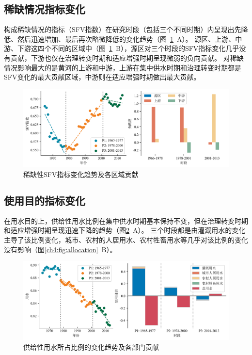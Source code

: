 \subsection{稀缺情况指标变化}

构成稀缺情况的指标（SFV指数）在研究时段（包括三个不同时期）内呈现出先降低、然后迅速增加、最后再次略微降低的变化趋势（图~\ref{ch4:fig:scarcity}~A）。
源区、上游、中游、下游这四个不同的区域中（图~\ref{ch4:fig:scarcity}~B），源区对三个时段的SFV指标变化几乎没有贡献，下游也仅在治理转变时期和适应增强时期呈现微弱的负向贡献。
对稀缺情况影响最大的是黄河的上游和中游，上游在集中供水时期和治理转变时期都是SFV变化的最大贡献区域，中游则在适应增强时期做出最大贡献。

\begin{figure}[htb]
  \centering
  \includegraphics[width=\textwidth]{img/ch4/ch4_scarcity.png}
  \caption{稀缺性SFV指标变化趋势及各区域贡献}\label{ch4:fig:scarcity}
\end{figure}


\subsection{使用目的指标变化}

在用水目的上，供给性用水比例在集中供水时期基本保持不变，但在治理转变时期和适应增强时期呈现迅速下降的趋势（图\ref{ch4:fig:priority}~A）。
三个时段都是由灌溉用水的变化主导了该比例变化，城市、农村的人居用水、农村牲畜用水等几乎对该比例的变化没有影响（图\ref{ch4:fig:allocation}~B）。

\begin{figure}[htb]
	\centering
	\includegraphics[width=\textwidth]{img/ch4/ch4_priority.png}
	\caption{供给性用水所占比例的变化趋势及各部门贡献}\label{ch4:fig:priority}
\end{figure}

